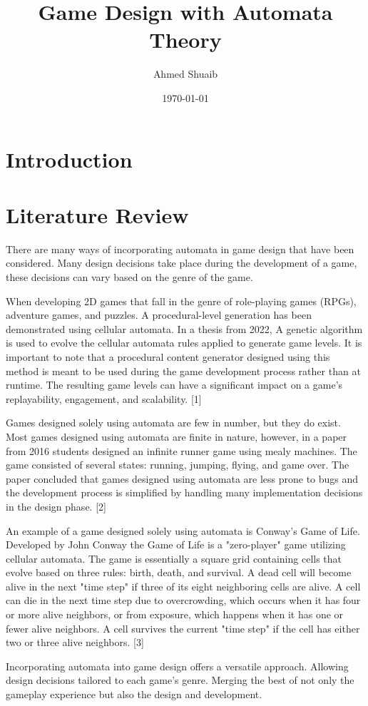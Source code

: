 \documentclass[10pt]{article}
\title{\vspace{-1in}\huge{Game Design with Automata Theory}}
\author{Ahmed Shuaib}
\date{\today}
\begin{document}
\maketitle
\vspace{-0.5in}
\section*{Introduction}

\section*{Literature Review}
There are many ways of incorporating automata in game design that have been considered. Many design decisions take place during the development of a game, these decisions can vary based on the genre of the game.
\par
When developing 2D games that fall in the genre of role-playing games (RPGs), adventure games, and puzzles. A procedural-level generation has been demonstrated using cellular automata. In a thesis from 2022, A genetic algorithm is used to evolve the cellular automata rules applied to generate game levels. It is important to note that a procedural content generator designed using this method is meant to be used during the game development process rather than at runtime. The resulting game levels can have a significant impact on a game's replayability, engagement, and scalability. [1]
\par
Games designed solely using automata are few in number, but they do exist. Most games designed using automata are finite in nature, however, in a paper from 2016 students designed an infinite runner game using mealy machines. The game consisted of several states: running, jumping, flying, and game over. The paper concluded that games designed using automata are less prone to bugs and the development process is simplified by handling many implementation decisions in the design phase. [2]
\par
An example of a game designed solely using automata is Conway's Game of Life. Developed by John Conway the Game of Life is a "zero-player" game utilizing cellular automata. The game is essentially a square grid containing cells that evolve based on three rules: birth, death, and survival. A dead cell will become alive in the next "time step" if three of its eight neighboring cells are alive. A cell can die in the next time step due to overcrowding, which occurs when it has four or more alive neighbors, or from exposure, which happens when it has one or fewer alive neighbors. A cell survives the current "time step" if the cell has either two or three alive neighbors. [3]
\par
Incorporating automata into game design offers a versatile approach. Allowing design decisions tailored to each game's genre. Merging the best of not only the gameplay experience but also the design and development.
\end{document}
